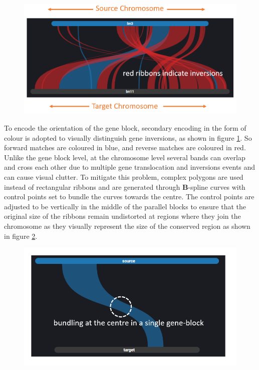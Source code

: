 \begin{figure}[h]
  \centering
  \includegraphics[width=.60\linewidth]{images/ch_4_link_plot_chromosome_a.PNG}
  \label{fig:ch_4_link_plot_chromosome_a}
\end{figure}


To encode the orientation of the gene block, secondary encoding in the form of colour is adopted to visually distinguish gene inversions, as shown in figure \ref{fig:ch_4_link_plot_chromosome_a}. So forward matches are coloured in blue, and reverse matches are coloured in red. Unlike the gene block level, at the chromosome level several bands can overlap and cross each other due to multiple gene translocation and inversions events and can cause visual clutter. To mitigate this problem, complex polygons are used instead of rectangular ribbons and are generated through \textbf{B}-spline curves\cite{ref851370272} with control points set to bundle the curves towards the centre\cite{zhou2013edge}. The control points are adjusted to be vertically in the middle of the parallel blocks to ensure that the original size of the ribbons remain undistorted at regions where they join the chromosome as they visually represent the size of the conserved region as shown in figure \ref{fig:ch_4_link_plot_chromosome_b}. 

\begin{figure}
  \centering
  \includegraphics[width=.50\linewidth]{images/ch_4_link_plot_chromosome_b.PNG}
  \label{fig:ch_4_link_plot_chromosome_b}
\end{figure}


